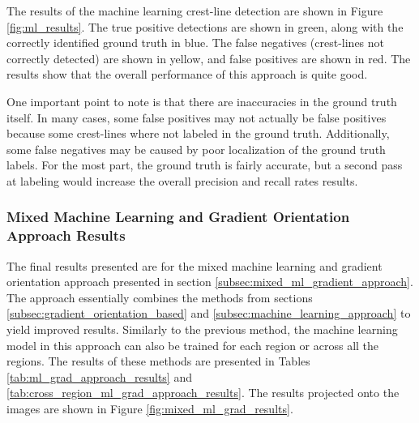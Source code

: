 The results of the machine learning crest-line detection are shown in Figure \ref{fig:ml_results}. The true positive detections are shown in green, along with the correctly identified ground truth in blue. The false negatives (crest-lines not correctly detected) are shown in yellow, and false positives are shown in red. The results show that the overall performance of this approach is quite good. 

One important point to note is that there are inaccuracies in the ground truth itself. In many cases, some false positives may not actually be false positives because some crest-lines where not labeled in the ground truth. Additionally, some false negatives may be caused by poor localization of the ground truth labels. For the most part, the ground truth is fairly accurate, but a second pass at labeling would increase the overall precision and recall rates results.

\subsubsection*{Mixed Machine Learning and Gradient Orientation Approach Results}

The final results presented are for the mixed machine learning and gradient orientation approach presented in section \ref{subsec:mixed_ml_gradient_approach}. The approach essentially combines the methods from sections \ref{subsec:gradient_orientation_based} and \ref{subsec:machine_learning_approach} to yield improved results. Similarly to the previous method, the machine learning model in this approach can also be trained for each region or across all the regions. The results of these methods are presented in Tables \ref{tab:ml_grad_approach_results} and \ref{tab:cross_region_ml_grad_approach_results}. The results projected onto the images are shown in Figure \ref{fig:mixed_ml_grad_results}.

